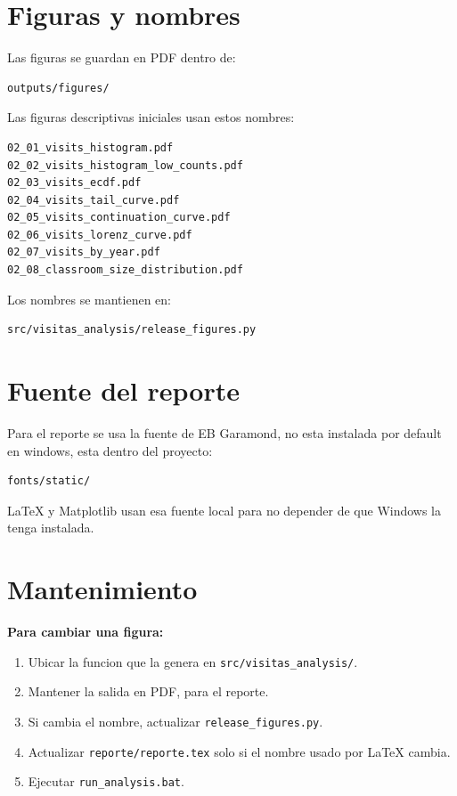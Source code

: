 \documentclass[11pt,letterpaper]{article}
\newcommand{\code}[1]{\texttt{#1}}
\begin{document}
\section{Figuras y nombres}

\begin{summary}
Las figuras se guardan en PDF dentro de:

\begin{verbatim}
outputs/figures/
\end{verbatim}
\end{summary}

Las figuras descriptivas iniciales usan estos nombres:

\begin{verbatim}
02_01_visits_histogram.pdf
02_02_visits_histogram_low_counts.pdf
02_03_visits_ecdf.pdf
02_04_visits_tail_curve.pdf
02_05_visits_continuation_curve.pdf
02_06_visits_lorenz_curve.pdf
02_07_visits_by_year.pdf
02_08_classroom_size_distribution.pdf
\end{verbatim}

Los nombres se mantienen en:

\begin{verbatim}
src/visitas_analysis/release_figures.py
\end{verbatim}

\section{Fuente del reporte}

Para el reporte se usa la fuente de EB Garamond, no esta instalada por default en windows, esta dentro del proyecto:

\begin{verbatim}
fonts/static/
\end{verbatim}

LaTeX y Matplotlib usan esa fuente local para no depender de que Windows la tenga
instalada.



\section{Mantenimiento}


\textbf{Para cambiar una figura:}

\begin{enumerate}
  \item Ubicar la funcion que la genera en \code{src/visitas\_analysis/}.
  \item Mantener la salida en PDF, para el reporte.
  \item Si cambia el nombre, actualizar \code{release\_figures.py}.
  \item Actualizar \code{reporte/reporte.tex} solo si el nombre usado por LaTeX cambia.
  \item Ejecutar \code{run\_analysis.bat}.
\end{enumerate}
\end{document}
